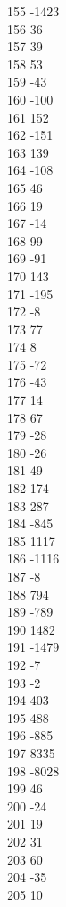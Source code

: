 { 155	-1423 \\
 156	36 \\
 157	39 \\
 158	53 \\
 159	-43 \\
 160	-100 \\
 161	152 \\
 162	-151 \\
 163	139 \\
 164	-108 \\
 165	46 \\
 166	19 \\
 167	-14 \\
 168	99 \\
 169	-91 \\
 170	143 \\
 171	-195 \\
 172	-8 \\
 173	77 \\
 174	8 \\
 175	-72 \\
 176	-43 \\
 177	14 \\
 178	67 \\
 179	-28 \\
 180	-26 \\
 181	49 \\
 182	174 \\
 183	287 \\
 184	-845 \\
 185	1117 \\
 186	-1116 \\
 187	-8 \\
 188	794 \\
 189	-789 \\
 190	1482 \\
 191	-1479 \\
 192	-7 \\
 193	-2 \\
 194	403 \\
 195	488 \\
 196	-885 \\
 197	8335 \\
 198	-8028 \\
 199	46 \\
 200	-24 \\
 201	19 \\
 202	31 \\
 203	60 \\
 204	-35 \\
 205	10 \\
}
